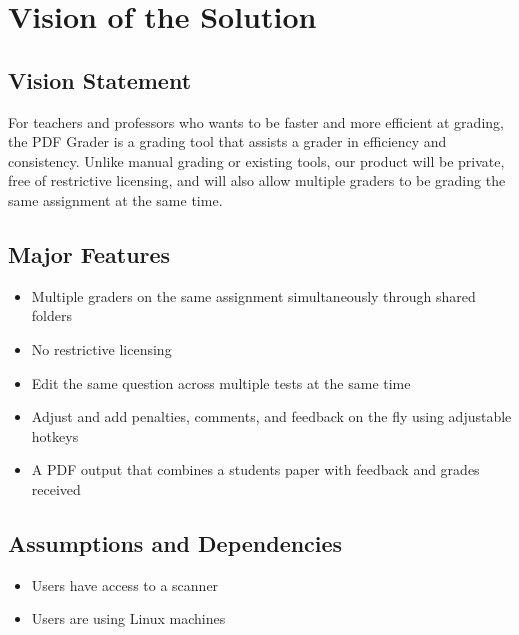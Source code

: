 \section{Vision of the Solution}
\subsection{Vision Statement}
%
For teachers and professors 
who wants to be faster and more efficient at grading, 
the PDF Grader 
is a grading tool that assists a grader in efficiency and consistency. 
Unlike manual grading or existing tools, 
our product will be private, free of restrictive licensing, and will also allow multiple graders to be grading the same assignment at the same time.

\subsection{Major Features}
\begin{itemize}
  \item Multiple graders on the same assignment simultaneously through shared folders
  \item No restrictive licensing
  \item Edit the same question across multiple tests at the same time
  \item Adjust and add penalties, comments, and feedback on the fly using adjustable hotkeys
  \item A PDF output that combines a students paper with feedback and grades received
\end{itemize}

\subsection{Assumptions and Dependencies}
\begin{itemize}
  \item Users have access to a scanner
  \item Users are using Linux machines
\end{itemize}
